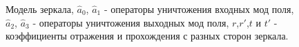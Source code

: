 \begin{figure}
\centering



\caption{Модель зеркала, $\hat{a}_0$, $\hat{a}_1$ - операторы
  уничтожения входных мод поля, $\hat{a}_2$, $\hat{a}_3$ - операторы 
  уничтожения выходных мод поля, $r$,$r'$,$t$ и $t'$ - коэффициенты
  отражения и прохождения с разных сторон зеркала.}
\label{figPart2Interfero_1}
\end{figure}
